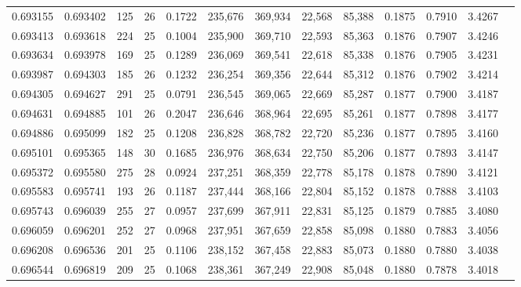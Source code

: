 \begin{tabular}{rrrrrrrrrrrrr}
0.693155 & 0.693402 &   125 &  26 &                                     0.1722 & 235,676 & 369,934 &  22,568 &  85,388 & 0.1875 & 0.7910 & 3.4267 \\
0.693413 & 0.693618 &   224 &  25 &                                     0.1004 & 235,900 & 369,710 &  22,593 &  85,363 & 0.1876 & 0.7907 & 3.4246 \\
0.693634 & 0.693978 &   169 &  25 &                                     0.1289 & 236,069 & 369,541 &  22,618 &  85,338 & 0.1876 & 0.7905 & 3.4231 \\
0.693987 & 0.694303 &   185 &  26 &                                     0.1232 & 236,254 & 369,356 &  22,644 &  85,312 & 0.1876 & 0.7902 & 3.4214 \\
0.694305 & 0.694627 &   291 &  25 &                                     0.0791 & 236,545 & 369,065 &  22,669 &  85,287 & 0.1877 & 0.7900 & 3.4187 \\
0.694631 & 0.694885 &   101 &  26 &                                     0.2047 & 236,646 & 368,964 &  22,695 &  85,261 & 0.1877 & 0.7898 & 3.4177 \\
0.694886 & 0.695099 &   182 &  25 &                                     0.1208 & 236,828 & 368,782 &  22,720 &  85,236 & 0.1877 & 0.7895 & 3.4160 \\
0.695101 & 0.695365 &   148 &  30 &                                     0.1685 & 236,976 & 368,634 &  22,750 &  85,206 & 0.1877 & 0.7893 & 3.4147 \\
0.695372 & 0.695580 &   275 &  28 &                                     0.0924 & 237,251 & 368,359 &  22,778 &  85,178 & 0.1878 & 0.7890 & 3.4121 \\
0.695583 & 0.695741 &   193 &  26 &                                     0.1187 & 237,444 & 368,166 &  22,804 &  85,152 & 0.1878 & 0.7888 & 3.4103 \\
0.695743 & 0.696039 &   255 &  27 &                                     0.0957 & 237,699 & 367,911 &  22,831 &  85,125 & 0.1879 & 0.7885 & 3.4080 \\
0.696059 & 0.696201 &   252 &  27 &                                     0.0968 & 237,951 & 367,659 &  22,858 &  85,098 & 0.1880 & 0.7883 & 3.4056 \\
0.696208 & 0.696536 &   201 &  25 &                                     0.1106 & 238,152 & 367,458 &  22,883 &  85,073 & 0.1880 & 0.7880 & 3.4038 \\
0.696544 & 0.696819 &   209 &  25 &                                     0.1068 & 238,361 & 367,249 &  22,908 &  85,048 & 0.1880 & 0.7878 & 3.4018 \\

\end{tabular}
